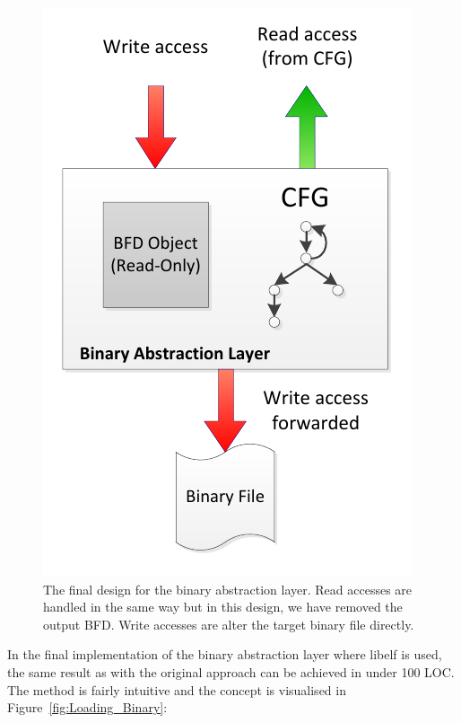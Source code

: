 \begin{figure}[H]
 \centering
 \includegraphics{Binary_Abstraction_Layer_Final.pdf}
 \caption{The final design for the binary abstraction layer. Read accesses are handled in the same way but in this design, we have removed the output BFD. Write accesses are alter the target binary file directly.}
\label{fig:BAL_Final}
\end{figure}
 
In the final implementation of the binary abstraction layer where libelf is used, the same result as with the original approach can be achieved in under 100 LOC. The method is fairly intuitive and the concept is visualised in Figure~\ref{fig:Loading_Binary}:
 
